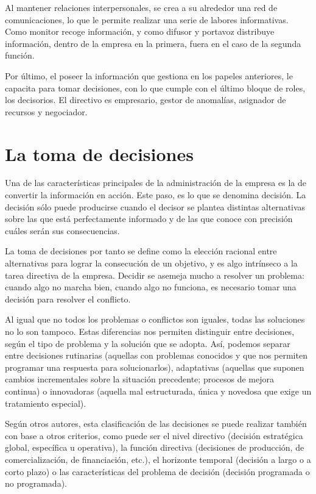 \documentclass[
]{krantz}
\begin{document}
Al mantener relaciones interpersonales, se crea a su alrededor una red de comunicaciones, lo que le permite realizar una serie de labores informativas. Como monitor recoge información, y como difusor y portavoz distribuye información, dentro de la empresa en la primera, fuera en el caso de la segunda función.

Por último, el poseer la información que gestiona en los papeles anteriores, le capacita para tomar decisiones, con lo que cumple con el último bloque de roles, los decisorios. El directivo es empresario, gestor de anomalías, asignador de recursos y negociador.

\hypertarget{la-toma-de-decisiones}{%
\section{La toma de decisiones}\label{la-toma-de-decisiones}}

Una de las características principales de la administración de la empresa es la de convertir la información en acción. Este paso, es lo que se denomina decisión. La decisión sólo puede producirse cuando el decisor se plantea distintas alternativas sobre las que está perfectamente informado y de las que conoce con precisión cuáles serán sus consecuencias.

La toma de decisiones por tanto se define como la elección racional entre alternativas para lograr la consecución de un objetivo, y es algo intrínseco a la tarea directiva de la empresa. Decidir se asemeja mucho a resolver un problema: cuando algo no marcha bien, cuando algo no funciona, es necesario tomar una decisión para resolver el conflicto.

Al igual que no todos los problemas o conflictos son iguales, todas las soluciones no lo son tampoco. Estas diferencias nos permiten distinguir entre decisiones, según el tipo de problema y la solución que se adopta. Así, podemos separar entre decisiones rutinarias (aquellas con problemas conocidos y que nos permiten programar una respuesta para solucionarlos), adaptativas (aquellas que suponen cambios incrementales sobre la situación precedente; procesos de mejora continua) o innovadoras (aquella mal estructurada, única y novedosa que exige un tratamiento especial).

Según otros autores, esta clasificación de las decisiones se puede realizar también con base a otros criterios, como puede ser el nivel directivo (decisión estratégica global, específica u operativa), la función directiva (decisiones de producción, de comercialización, de financiación, etc.), el horizonte temporal (decisión a largo o a corto plazo) o las características del problema de decisión (decisión programada o no programada).
\end{document}
